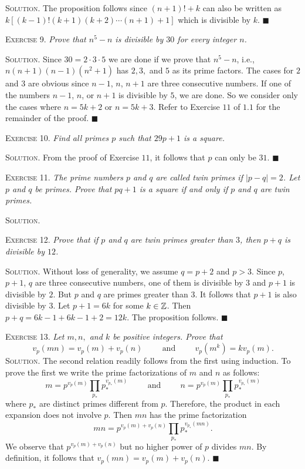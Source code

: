 \documentclass[11pt, leqno]{article}
\newcommand{\done}{\ensuremath{\blacksquare}}
\begin{document}
\textsc{Solution}. The proposition follows since $(n+1)!+k$ can also be written as $k[(k-1)!(k+1)(k+2)\cdots (n+1) + 1]$ which is divisible by $k$. \done

\textsc{Exercise 9}. \emph{Prove that $n^5-n$ is divisible by $30$ for every integer $n$.}

\textsc{Solution}. Since $30 = 2\cdot 3\cdot 5$ we are done if we prove that $n^5-n$, i.e., $n(n+1)(n-1)(n^2+1)$ has $2, 3,$ and $5$ as its prime factors. The cases for $2$ and $3$ are obvious since $n-1$, $n$, $n+1$ are three consecutive numbers. If one of the numbers $n-1$, $n$, or $n+1$ is divisible by $5$, we are done. So we consider only the cases where $n=5k+2$ or $n=5k+3$. Refer to Exercise $11$ of $1.1$ for the remainder of the proof. \done

\textsc{Exercise 10}. \emph{Find all primes $p$ such that $29p+1$ is a square.}

\textsc{Solution}. From the proof of Exercise $11$, it follows that $p$ can only be $31$. \done

\textsc{Exercise 11}. \emph{The prime numbers $p$ and $q$ are called twin primes if $|p-q|=2$. Let $p$ and $q$ be primes. Prove that $pq+1$ is a square if and only if $p$ and $q$ are twin primes.}

\textsc{Solution}.

\textsc{Exercise 12}. \emph{Prove that if $p$ and $q$ are twin primes greater than $3$, then $p+q$ is divisible by $12$.}

\textsc{Solution}. Without loss of generality, we assume $q = p+2$ and $p>3$. Since $p$, $p+1$, $q$ are three consecutive numbers, one of them is divisible by $3$ and $p+1$ is divisible by $2$. But $p$ and $q$ are primes greater than $3$. It follows that $p+1$ is also divisible by $3$. Let $p+1 = 6k$ for some $k\in\mathbb{Z}$. Then $p+q = 6k - 1 + 6k-1 + 2 = 12k$. The proposition follows. \done

\textsc{Exercise 13}. \emph{Let $m, n,$ and $k$ be positive integers. Prove that 
\begin{displaymath}
v_p(mn) = v_p(m) + v_p(n) \hspace{1cm}\text{and}\hspace{1cm} v_p(m^k) = kv_p(m).
\end{displaymath}}\textsc{Solution}. The second relation readily follows from the first using induction. To prove the first we write the prime factorizations of $m$ and $n$ as follows: 
\begin{displaymath}
m = p^{v_p(m)}\prod_{p_{*}}^{} p_{*}^{v_{p_{*}}(m)} \hspace{1cm}\text{and}\hspace{1cm} n = p^{v_p(m)}\prod_{p_{*}}^{} p_{*}^{v_{p_{*}}(m)}
\end{displaymath}
where $p_{*}$ are distinct primes different from $p$. Therefore, the product in each expansion does not involve $p$. Then $mn$ has the prime factorization 
\begin{displaymath}
mn = p^{v_p(m)+v_p(n)}\prod_{p_{*}}^{}p_{*}^{v_{p_{*}}(mn)}.
\end{displaymath}
We observe that $p^{v_p(m)+v_p(n)}$ but no higher power of $p$ divides $mn$. By definition, it follows that $v_p(mn) = v_p(m) + v_p(n)$. \done
\end{document}
